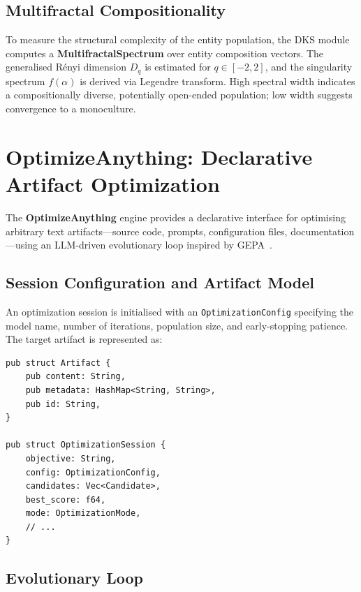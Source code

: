 \documentclass[11pt]{article}
\begin{document}
\subsection{Multifractal Compositionality}

To measure the structural complexity of the entity population, the DKS module
computes a \textbf{MultifractalSpectrum} over entity composition vectors. The
generalised Rényi dimension $D_q$ is estimated for $q \in [-2, 2]$, and the
singularity spectrum $f(\alpha)$ is derived via Legendre transform. High spectral
width indicates a compositionally diverse, potentially open-ended population; low
width suggests convergence to a monoculture.

\section{OptimizeAnything: Declarative Artifact Optimization}
\label{sec:optimize}

The \textbf{OptimizeAnything} engine provides a declarative interface for
optimising arbitrary text artifacts---source code, prompts, configuration files,
documentation---using an LLM-driven evolutionary loop inspired by
GEPA~\cite{agrawal2025gepa}.

\subsection{Session Configuration and Artifact Model}

An optimization session is initialised with an \texttt{OptimizationConfig}
specifying the model name, number of iterations, population size, and early-stopping
patience. The target artifact is represented as:

\begin{lstlisting}[caption={Rust artifact and session initialisation.}]
pub struct Artifact {
    pub content: String,
    pub metadata: HashMap<String, String>,
    pub id: String,
}

pub struct OptimizationSession {
    objective: String,
    config: OptimizationConfig,
    candidates: Vec<Candidate>,
    best_score: f64,
    mode: OptimizationMode,
    // ...
}
\end{lstlisting}

\subsection{Evolutionary Loop}
\end{document}
